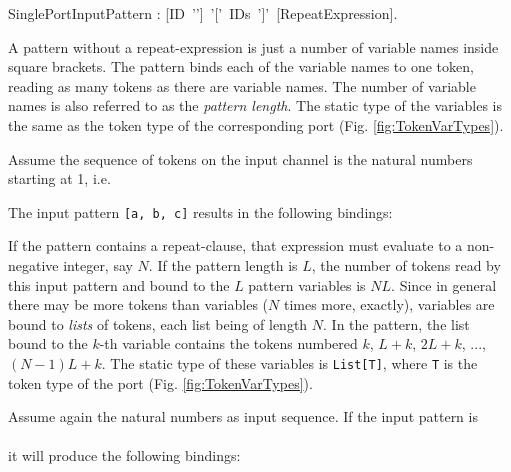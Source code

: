 \bgr
SinglePortInputPattern : [ID~'\charColon']~'['~IDs~']'~[RepeatExpression].
\egr

A pattern without a repeat-expression is just a number of variable
names inside square brackets. The pattern binds each of the variable
names to one token, reading as many tokens as there are variable
names. The number of variable names is also referred to as the {\em
  pattern length}. The static type of the variables is the same as the
token type of the corresponding port (Fig. \ref{fig:TokenVarTypes}).

\begin{example}
  Assume the sequence of tokens on the input channel is the natural
  numbers starting at 1, i.e.\\

  The input pattern {\tt [a, b, c]} results in the following
  bindings:\\
\end{example}


If the pattern contains a repeat-clause, that expression must
evaluate to a non-negative integer, say $N$. If the pattern length is
$L$, the number of tokens read by this input pattern and bound to the $L$
pattern variables is $N L$. Since in general there may be more
tokens than variables ($N$ times more, exactly), variables are bound
to {\em lists} of tokens, each list being of length $N$. In the
pattern, the list bound to the $k$-th variable contains the tokens
numbered $k$, $L+k$, $2L+k$, ..., $(N-1)L+k$. The static type of these
variables is {\tt List[T]}, where {\tt T} is the token type of the
port (Fig. \ref{fig:TokenVarTypes}).

\begin{example}
  Assume again the natural numbers as input sequence. If the input pattern
  is\\
  \\
  it will produce the following bindings:\\
\end{example}




